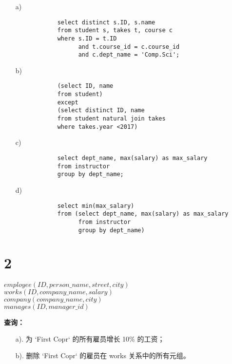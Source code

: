 \documentclass{article}
\begin{document}
	\begin{enumerate}[noitemsep, label={{\arabic*})}]
		\item[a)] 
		
		\begin{verbatim}
			select distinct s.ID, s.name
			from student s, takes t, course c
			where s.ID = t.ID
			      and t.course_id = c.course_id
			      and c.dept_name = 'Comp.Sci';
		\end{verbatim}
		
		\item[b)]
		
		\begin{verbatim}
			(select ID, name
			from student)
			except
			(select distinct ID, name
			from student natural join takes
			where takes.year <2017)
		\end{verbatim}
		
		\item[c)]
		
		\begin{verbatim}
			select dept_name, max(salary) as max_salary
			from instructor
			group by dept_name;
		\end{verbatim}
		
		\item[d)] 
		
		\begin{verbatim}
			select min(max_salary)
			from (select dept_name, max(salary) as max_salary
			      from instructor
			      group by dept_name)
		\end{verbatim}
	\end{enumerate}\textbf{}
	
	\section*{2}
	
	\noindent
	
	\begin{tcolorbox}[title = {雇员数据库}, colback = blue!25!white, colframe = blue!75!black]
		$employee(ID, person\_name, street, city)$ \\
		$works(ID, company\_name, salary)$ \\
		$company(company\_name, city)$ \\
		$manages(ID, manager\_id)$
	\end{tcolorbox}
	
	\noindent
	
	\textbf{查询：}
	
	\begin{enumerate}
		\item[a).] 为 `First Copr` 的所有雇员增长 10\% 的工资；
		\item[b).] 删除 `First Copr` 的雇员在 works 关系中的所有元组。
	\end{enumerate}
	
\end{document}
